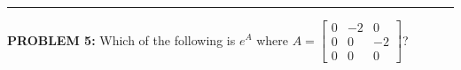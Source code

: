\documentclass[12pt]{amsart}
\newcommand{\divider}{
  \vspace{-1em} %
  \noindent
  \raisebox{-0.15ex}{\textbullet}%
  \hspace{0.5em}%
  \rule[0.5ex]{0.95\textwidth}{1.0pt}%
  \hspace{0.5em}%
  \raisebox{-0.15ex}{\textbullet}%
  \vspace{0em} %
}
\begin{document}
%
%
%
%
%
%
%
%

\divider

{\bf PROBLEM 5:}
%
Which of the following is $e^{A}$ where 
$A = \begin{bmatrix} 0 & -2 & 0 \\ 0 & 0 & -2 \\ 0 & 0 & 0 \end{bmatrix}$?
\end{document}
